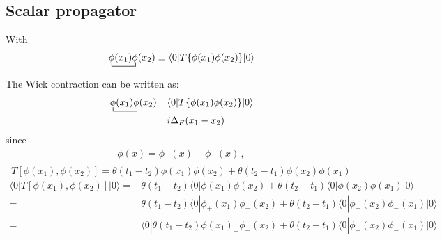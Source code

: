 \subsection{Scalar propagator}

With
\begin{align}
  \bcontraction{\,}{\phi}{(x_1)}{\phi}
\,\phi(x_1)\phi(x_2)\equiv \left\langle 0 |   T\{\phi(x_1)\phi(x_2)\} | 0 \right\rangle
\end{align}




The Wick contraction can be written as:
\begin{align}
\label{eq:77f}
  \bcontraction{\,}{\phi}{(x_1)}{\phi}
\,\phi(x_1)\phi(x_2)=&\langle0|T\{\phi(x_1)\phi(x_2)\}|0\rangle\nonumber\\
=&i\Delta_F(x_1-x_2)
\end{align}
since
\begin{align}
  \phi(x)=\phi_+(x)+\phi_-(x)\,,
\end{align}
\begin{align}
T\left[\phi(x_1),\phi(x_2)\right]=\theta(t_1-t_2)\phi(x_1)\phi(x_2)+\theta(t_2-t_1)\phi(x_2)\phi(x_1)
\end{align}
\begin{align}
    \langle0|T\left[\phi(x_1),\phi(x_2)\right]|0\rangle=&\theta(t_1-t_2)\langle0|\phi(x_1)\phi(x_2)+\theta(t_2-t_1)\langle0|\phi(x_2)\phi(x_1)|0\rangle\nonumber\\
   =&\theta(t_1-t_2)\langle0|\phi_+(x_1)\phi_-(x_2)+\theta(t_2-t_1)\langle0|\phi_+(x_2)\phi_-(x_1)|0\rangle\nonumber\\
     =&\langle0|\theta(t_1-t_2)\phi(x_1)_+\phi_-(x_2)+\theta(t_2-t_1)\langle0|\phi_+(x_2)\phi_-(x_1)|0\rangle
\end{align}


